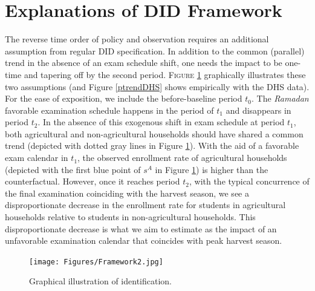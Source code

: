 \documentclass[12pt,letterpaper]{article}\usepackage[margin=1in]{geometry}
\newcommand{\0}{\ensuremath{\mbox{\boldmath $0$}}}
\begin{document}
\pagebreak

\section{Explanations of DID Framework}\label{app_a2}

The reverse time order of policy and observation requires an additional assumption from regular DID specification. In addition to the common (parallel) trend in the absence of an exam schedule shift, one needs the impact to be one-time and tapering off by the second period. \textsc{\small Figure \ref{ididea}} graphically illustrates these two assumptions (and Figure \ref{ptrendDHS} shows empirically with the DHS data). For the ease of exposition, we include the before-baseline period $t_{0}$. The \textit{Ramadan} favorable examination schedule happens in the period of $t_{1}$ and disappears in period $t_{2}$. In the absence of this exogenous shift in exam schedule at period $t_{1}$, both agricultural and non-agricultural households should have shared a common trend (depicted with dotted gray lines in Figure \ref{ididea}). With the aid of a favorable exam calendar in $t_{1}$, the observed enrollment rate of agricultural households (depicted with the first blue point of $s^{A}$ in Figure \ref{ididea}) is higher than the counterfactual. However, once it reaches period $t_{2}$, with the typical concurrence of the final examination coinciding with the harvest season, we see a disproportionate decrease in the enrollment rate for students in agricultural households relative to students in non-agricultural households. This disproportionate decrease is what we aim to estimate as the impact of an unfavorable examination calendar that coincides with peak harvest season.

\begin{figure}[h!]
\centering
\texttt{[image: Figures/Framework2.jpg]}\\
\caption{Graphical illustration of identification.\protect\footnotemark}
\label{ididea}
\end{figure}

\end{document}
